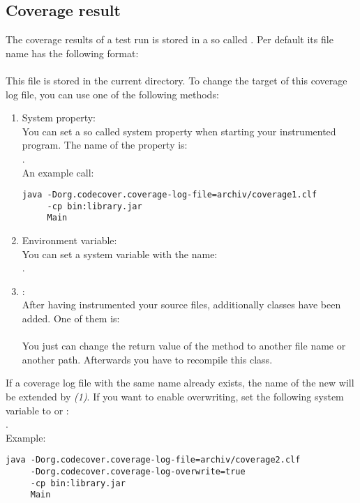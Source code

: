 \subsection{Coverage result}
The coverage results of a test run is stored in a so called . Per default its file name has the following format: \\
 \\
This file is stored in the current directory. To change the target of this coverage log file, you can use one of the following methods:
\begin{enumerate}
  \item System property: \\
You can set a so called system property when starting your instrumented program. The name of the property is: \\
. \\
An example call:
\begin{verbatim}
java -Dorg.codecover.coverage-log-file=archiv/coverage1.clf
     -cp bin:library.jar
     Main
\end{verbatim}
  \item Environment variable: \\
You can set a system variable with the name: \\
.
  \item {}: \\
After having instrumented your source files, additionally classes have been added. One of them is: \\
 \\
You just can change the return value of the method  to another file name or another path. Afterwards you have to recompile this class.
\end{enumerate}
If a coverage log file with the same name already exists, the name of the new  will be extended by \textit{(1)}. If you want to enable overwriting, set the following system variable to  or : \\
. \\
Example:
\begin{verbatim}
java -Dorg.codecover.coverage-log-file=archiv/coverage2.clf
     -Dorg.codecover.coverage-log-overwrite=true
     -cp bin:library.jar
     Main
\end{verbatim}

